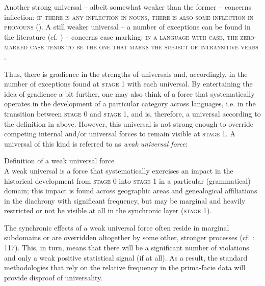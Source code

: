 \documentclass[output=paper]{langsci/langscibook}
\begin{document}
Another strong universal – albeit somewhat weaker than the former – concerns inflection: \textsc{if there is any inflection in nouns, there is also some inflection in pronouns} (\citealt{Moravcsik1993_Gov,Plank2002ff_Univ}). A still weaker universal – a number of exceptions can be found in the literature (cf. \citealt{Handschuh2014_S}) – concerns case marking: \textsc{in a language with case, the zero-marked case tends to be the one that marks the subject of intransitive verbs} \citep[95]{Greenberg1963}. 

Thus, there is gradience in the strengths of universals and, accordingly, in the number of exceptions found at \textsc{stage 1} with each universal. By entertaining the idea of gradience a bit further, one may also think of a force that systematically operates in the development of a particular category across languages, i.e. in the transition between \textsc{stage} 0 and \textsc{stage} 1, and is, therefore, a universal according to the definition in  above. However, this universal is not strong enough to override competing internal and/or universal forces to remain visible at \textsc{stage} 1. A universal of this kind is referred to as \textit{weak} \textit{universal} \textit{force}\textsc{:} 

\ea\label{ex:serzant:2}
Definition of a weak universal force\\
A weak universal is a force that systematically exercises an impact in the historical development from \textsc{stage 0} into \textsc{stage 1} in a particular (grammatical) domain; this impact is found across geographic areas and genealogical affiliations in the diachrony with significant frequency, but may be marginal and heavily restricted or not be visible at all in the synchronic layer (\textsc{stage 1}).
\z

The synchronic effects of a weak universal force often reside in marginal subdomains or are overridden altogether by some other, stronger processes (cf. \citealt{Bickel2014}: 117). This, in turn, means that there will be a significant number of violations and only a weak positive statistical signal (if at all). As a result, the standard methodologies that rely on the relative frequency in the prima-facie data will provide disproof of universality. 
\end{document}
